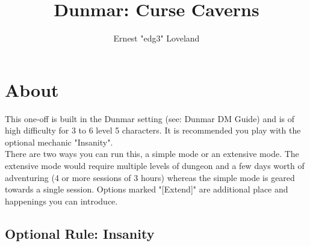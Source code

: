 \documentclass[10pt,twoside,twocolumn]{article}
\title{Dunmar: Curse Caverns}
\author{Ernest "edg3" Loveland}
\begin{document}
\selectfont %

\maketitle
\tableofcontents


\section{About}
This one-off is built in the Dunmar setting (see: Dunmar DM Guide) and is of high difficulty for 3 to 6 level 5 characters. It is recommended you play with the optional mechanic "Insanity". \\

There are two ways you can run this, a simple mode or an extensive mode. The extensive mode would require multiple levels of dungeon and a few days worth of adventuring (4 or more sessions of 3 hours) whereas the simple mode is geared towards a single session. Options marked "[Extend]" are additional place and happenings you can introduce.

\subsection{Optional Rule: Insanity}
\end{document}
